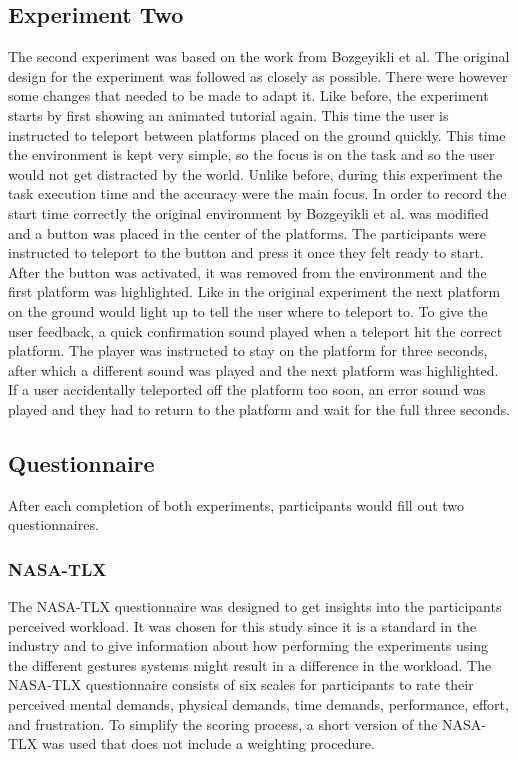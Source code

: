 \subsection{Experiment Two}
The second experiment was based on the work from Bozgeyikli et al. %
The original design for the experiment was followed as closely as possible. There were however some changes that needed to be made to adapt it. Like before, the experiment starts by first showing an animated tutorial again. This time the user is instructed to teleport between platforms placed on the ground quickly. This time the environment is kept very simple, so the focus is on the task and so the user would not get distracted by the world. Unlike before, during this experiment the task execution time and the accuracy were the main focus. In order to record the start time correctly the original environment by Bozgeyikli et al. was modified and a button was placed in the center of the platforms. The participants were instructed to teleport to the button and press it once they felt ready to start. After the button was activated, it was removed from the environment and the first platform was highlighted. Like in the original experiment the next platform on the ground would light up to tell the user where to teleport to. To give the user feedback, a quick confirmation sound played when a teleport hit the correct platform. The player was instructed to stay on the platform for three seconds, after which a different sound was played and the next platform was highlighted. If a user accidentally teleported off the platform too soon, an error sound was played and they had to return to the platform and wait for the full three seconds. 

\subsection{Questionnaire}
After each completion of both experiments, participants would fill out two questionnaires. 

\subsubsection{NASA-TLX}
The NASA-TLX questionnaire %
was designed to get insights into the participants perceived workload. It was chosen for this study since it is a standard in the industry and to give information about how performing the experiments using the different gestures systems might result in a difference in the workload. The NASA-TLX questionnaire consists of six scales for participants to rate their perceived mental demands, physical demands, time demands, performance, effort, and frustration. To simplify the scoring process, a short version of the NASA-TLX was used that does not include a weighting procedure. %

